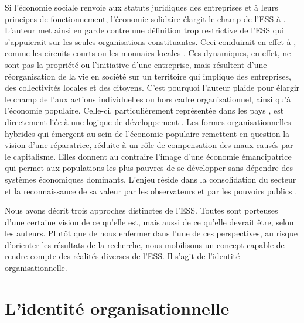             Si l’économie sociale renvoie aux statuts juridiques des entreprises et à leurs principes de fonctionnement, l’économie solidaire élargit le champ de l’ESS à  \parencite[][p. 323]{laville2016economie}. L’auteur met ainsi en garde contre une définition trop restrictive de l’ESS qui s’appuierait sur les seules organisations constituantes. Ceci conduirait en effet à , comme les circuits courts ou les monnaies locales \parencite{laville2017economie}. Ces dynamiques, en effet, ne sont pas la propriété ou l’initiative d’une entreprise, mais résultent d’une réorganisation de la vie en société sur un territoire qui implique des entreprises, des collectivités locales et des citoyens. C'est pourquoi l'auteur plaide pour élargir le champ de l'\ess aux actions individuelles ou hors cadre organisationnel, ainsi qu'à l'économie populaire. Celle-ci, particulièrement représentée dans les pays , est directement liée à une logique de développement \parencite{ndiaye2011leconomie}. Les formes organisationnelles hybrides qui émergent au sein de l'économie populaire remettent en question la vision d'une \ess réparatrice, réduite à un rôle de compensation des maux causés par le capitalisme. Elles donnent au contraire l'image d'une économie émancipatrice qui permet aux populations les plus pauvres de se développer sans dépendre des systèmes économiques dominants. L'enjeu réside dans la consolidation du secteur et la reconnaissance de sa valeur par les observateurs et par les pouvoirs publics \parencite{larraechea2007leconomie}.

            \transition

            Nous avons décrit trois approches distinctes de l'ESS. Toutes sont porteuses d'une certaine vision de ce qu'elle est, mais aussi de ce qu'elle devrait être, selon les auteurs. Plutôt que de nous enfermer dans l'une de ces perspectives, au risque d'orienter les résultats de la recherche, nous mobilisons un concept capable de rendre compte des réalités diverses de l'ESS. Il s'agit de l'identité organisationnelle.

\section{L'identité organisationnelle}
